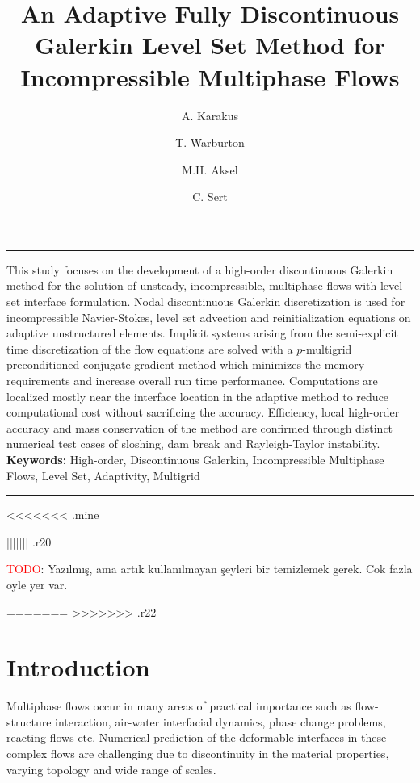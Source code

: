 \documentclass[11pt,a4paper,twoside]{article}
\renewenvironment{abstract}{%
	\begin{center}
		\begin{adjustbox}{minipage=0.90\textwidth,center} 
			\rule{\textwidth}{0.5pt}}
		{\par\noindent\rule{\textwidth}{0.5pt}  
		\end{adjustbox}
	\end{center} 
}
\begin{document}
	\title{An Adaptive Fully Discontinuous Galerkin Level Set Method for Incompressible Multiphase Flows}
	\author[1]{A. Karakus}
	\author[2]{T. Warburton}
	\author[1]{M.H. Aksel}
	\author[1]{C. Sert}
	
	\renewcommand\Authands{ and }
	\date{\vspace{-5ex}}
	
	\maketitle
	
	\begin{abstract}
		This study focuses on the development of a high-order discontinuous Galerkin method for the solution of unsteady, incompressible, multiphase flows with level set interface formulation.  Nodal discontinuous Galerkin discretization is used for incompressible Navier-Stokes, level set advection and reinitialization equations on adaptive unstructured elements. Implicit systems arising from the semi-explicit time discretization of  the flow equations are solved with a $ p $-multigrid preconditioned conjugate gradient method which minimizes the memory requirements and increase overall run time performance. Computations are localized mostly near the interface location in the adaptive method to reduce computational cost without sacrificing the accuracy. Efficiency, local high-order accuracy and mass conservation of the method are confirmed through distinct numerical test cases of sloshing, dam break and Rayleigh-Taylor instability. \\
		\textbf{Keywords:}  High-order, Discontinuous Galerkin, Incompressible Multiphase Flows,  Level Set, Adaptivity, Multigrid
	\end{abstract}

	
<<<<<<< .mine
	

||||||| .r20
	
	\textcolor{red}{\textcolor{red}{TODO}}: Yazılmış, ama artık kullanılmayan şeyleri bir temizlemek gerek. Cok fazla oyle yer var.
	
	
=======
>>>>>>> .r22
	\section{Introduction}
	Multiphase flows occur in many areas of practical importance such as flow-structure interaction, air-water interfacial dynamics, phase change problems, reacting flows etc. Numerical prediction of the deformable interfaces in these complex flows are challenging due to discontinuity in the material properties, varying topology and wide range of scales.
		
\end{document}
